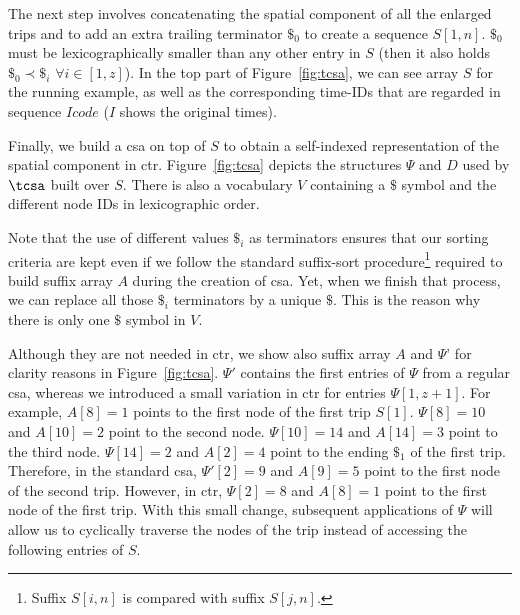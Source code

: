 	The next step involves concatenating the spatial component of all the enlarged trips and to add an 
	extra trailing terminator $\$_0$ to create a sequence $S[1,n]$. $\$_0$ must be  lexicographically 
	smaller than any other entry in $S$ (then it also holds $\$_0 \prec \$_i$ $\forall i \in [1,z]$). In the top part of
	Figure~\ref{fig:tcsa}, we can see array $S$ for the running example, as well as the corresponding time-IDs that
	are regarded in sequence $Icode$  ($I$ shows the original times).

	Finally, we build a \gls{csa} on top of $S$ to obtain a self-indexed representation of the spatial component in \gls{ctr}.
	Figure~\ref{fig:tcsa} depicts the structures $\Psi$ and $D$ used by $\tcsa$ built over $S$. There is also a vocabulary
	$V$ containing a $\$$ symbol and the different node IDs in lexicographic order.

	Note that the use of different values $\$_i$ as terminators ensures that our sorting criteria are kept even if we follow the
	standard suffix-sort procedure\footnote{Suffix $S[i,n]$ is compared with suffix $S[j,n]$.} 
	required to build suffix array $A$ during the creation of \gls{csa}. Yet, when we finish that
	process, we can replace all those $\$_i$ terminators  by a unique $\$$. This is the reason why 
	there is only one $\$$ symbol in $V$. 
	 


	Although they are not needed in \gls{ctr}, we show also suffix array $A$ and $\Psi$' for clarity reasons in Figure~\ref{fig:tcsa}. 
	$\Psi'$  contains the first entries of $\Psi$ from a regular \gls{csa}, whereas we introduced a small variation
	in \gls{ctr} for entries $\Psi[1,z+1]$.  %
	For example, $A[8]=1$ points to the first node of the first trip $S[1]$.
	$\Psi[8]=10$ and $A[10]=2$ point to the second node.  $\Psi[10]=14$ and $A[14]=3$ point to the third node.
	$\Psi[14]=2$ and $A[2]=4$ point to the ending $\$_1$ of the first trip. Therefore, in the standard 
	\gls{csa}, $\Psi'[2]=9$ and $A[9]=5$  point to the first node of the second trip. 
	However, in  \gls{ctr}, $\Psi[2]=8$ and $A[8]=1$ point
	to the first node of the first trip. With this small change, subsequent applications of $\Psi$ will allow 
	us to cyclically traverse the nodes of the trip instead of accessing the following entries of $S$.


